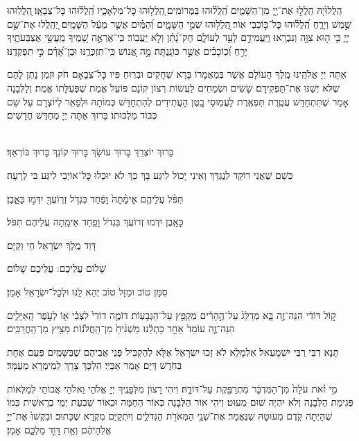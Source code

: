 \documentclass[twoside, openany, parskip=half, 11pt]{book}
\begin{document}
הַֽלֲלוּ֙יָהּ הַֽלֲל֣וּ אֶת־יְ֖יָ מִן־הַשָּׁמַ֑יִם הַֽ֝לֲל֗וּהוּ בַּמְּרוֹמִֽים׃
֭הַֽלֲל֥וּהוּ כׇּל־מַלְאָכָ֑יו הַֽ֝לֲל֗וּהוּ כׇּל־צְבָאָֽו׃
֖הַֽלֲלֽוּהוּ שֶׁ֣מֶשׁ וְיָרֵ֑חַ הַֽ֝לֲל֗וּהוּ כׇּל־כּ֥וֹכְבֵי אֽוֹר׃
֖הַֽלֲל֥וּהוּ שְׁמֵ֣י הַשָּׁמָ֑יִם וְ֝הַמַּ֗יִם אֲשֶׁ֤ר מֵעַ֬ל הַשָּׁמָֽיִם׃
יְ֭הַֽלֲלוּ אֶת־שֵׁ֣ם יְיָ֑ כִּ֤י ה֖וּא צִוָּ֣ה וְנִבְרָֽאוּ׃
וַיַּֽעֲמִידֵ֣ם לָעַ֣ד לְעוֹלָ֑ם חָק־נָ֝תַ֗ן וְלֹ֣א יַֽעֲבֽוֹר׃
כִּֽי־אֶרְאֶ֣ה שָׁ֭מֶיךָ מַֽעֲשֵׂ֣י אֶצְבְּעֹתֶ֑יךָ יָרֵ֥חַ וְ֝כֽוֹכָבִ֗ים אֲשֶׁ֣ר כּוֹנָֽנְתָּה׃
מָ֣ה אֱ֭נוֹשׁ כִּֽי־תִזְכְּרֶ֑נּוּ וּבֶן־אָ֝דָ֗ם כִּ֣י תִפְקְדֶֽנּוּ׃

אַתָּה יְיָ אֱלֹהֵֽינוּ מֶֽלֶךְ הָעוֹלָם אֲשֶׁר בְּמַאֲמָרוֹ בָּרָא שְׁחָקִים וּבְרֽוּחַ פִּיו כׇּל־צְבָאָם׃ חֹק וּזְמַן נָתַן לָהֶם שֶׁלֹּא יְשַׁנּוּ אֶת־תַּפְקִידָם׃ שָׂשִׂים וּשְׂמֵחִים לַעֲשׂוֹת רְצוֹן קוֹנָם פּוֹעֵל אֱמֶת שֶׁפְּעֻלָּתוֹ אֱמֶת׃ וְלַלְּבָנָה אָמַר שֶׁתִּתְחַדֵּשׁ עֲטֶֽרֶת תִּפְאֶֽרֶת לַעֲמֽוּסֵי בָֽטֶן הָעֲתִידִים לְהִתְחַדֵּשׁ כְּמוֹתָהּ וּלְפָאֵר לְיוֹצְרָם עַל שֵׁם כְּבוֹד מַלְכוּתוֹ׃ בָּרוּךְ אַתָּה יְיָ מְחַדֵּשׁ חֳדָשִׁים׃

\\
בָּרוּךְ יוֹצְרֵךְ בָּרוּךְ עוֹשֵׂךְ בָּרוּךְ קוֹנֵךְ בָּרוּךְ בּוֹרְאֵךְ׃

כְּשֵׁם שֶׁאֲנִי רוֹקֵד לְנֶגְדֵּךְ וְאֵינִי יָכוֹל לִיגַּע בָּךְ
כַּךְ לֹא יוּכְלוּ כׇּל־אוֹיְבַי לִיגַּע בִּי לְרָעָה׃

תִּפֹּ֨ל עֲלֵיהֶ֤ם אֵימָ֨תָה֙ וָפַ֔חַד בִּגְדֹ֥ל זְרֽוֹעֲךָ֖ יִדְּמ֣וּ כָּאָ֑בֶן׃


כָּאָֽבֶן יִדְּמוּ זְרוֹעֲךָ בִּגְדֹל וָפַֽחַד אֵימָֽתָה עֲלֵיהֶם תִּפֹּל׃


דָּוִד מֶֽלֶךְ יִשְׂרָאֵל חַי וְקַיָּם׃

שָׁלוֹם עֲלֵיכֶם: \qquad {}
עֲלֵיכֶם שָׁלוֹם׃


סִמָּן טוֹב וּמַזָּל טוֹב יְהֵא לָֽנוּ וּלְכׇל־יִשְׂרָאֵל אָמֵן׃

ק֣וֹל דּוֹדִ֔י הִנֵּה־זֶ֖ה בָּ֑א מְדַלֵּג֙ עַל־הֶ֣הָרִ֔ים מְקַפֵּ֖ץ עַל־הַגְּבָעֽוֹת׃ דּוֹמֶ֤ה דוֹדִי֙ לִצְבִ֔י א֖וֹ לְעֹ֣פֶר הָֽאַיָּלִ֑ים הִנֵּה־זֶ֤ה עוֹמֵד֙ אַחַ֣ר כָּתְלֵ֔נוּ מַשְׁגִּ֨יחַ֙ מִן־הַֽחֲלֹּנ֔וֹת מֵצִ֖יץ מִן־הַֽחֲרַכִּֽים׃

תָּנָא דִבֵּי רַבִּי יִשְׁמָעֵאל׃ אִלְמָלֵא לֹא זָכוּ יִשְׂרָאֵל אֶלָּא לְהַקְבִּיל פְּנֵי אֲבִיהֶם שֶׁבַּשָּׁמַֽיִם פַּעַם אֶחָת בַּחֹֽדֶשׁ דַּיָּם׃ אָמַר אַבַּיֵּי׃ הִלְכָּךְ צָרֵךְ לְמֵימְרָא מְעֻמָּד׃

מִ֣י זֹ֗את עֹלָה֙ מִן־הַמִּדְבָּ֔ר מִתְרַפֶּ֖קֶת עַל־דּוֹדָ֑הּ׃
וִיהִי רָצוֹן מִלְּפָנֶֽיךָ יְיָ אֱלֹהַי וֵאלֹהֵי אֲבוֹתַי לְמַלְּאוֹת פְּגִימַת הַלְּבָנָה וְלֹא יִהְיֶה שׁוּם מִעוּט׃ וִיהִי אוֹר הַלְּבָנָה כְּאוֹר הַחַמָּה וּכְאוֹר שִׁבְעַת יְמֵי בְרֵאשִׁית כְּמוֹ שֶׁהָיְתָה קֹֽדֶם מִעוּטָהּ שֶׁנֶּאֱמַר׃
אֶת־שְׁנֵ֥י הַמְּאֹרֹ֖ת הַגְּדֹלִ֑ים וְיִתְקַיַּם מִקְרָא שֶׁכָּתוּב׃ וּבִקְשׁוּ֙ אֶת־יְיָ֣ אֱלֹֽהֵיהֶ֔ם וְאֵ֖ת דָּוִ֣ד מַלְכָּ֑ם אָמֵן׃
\end{document}
